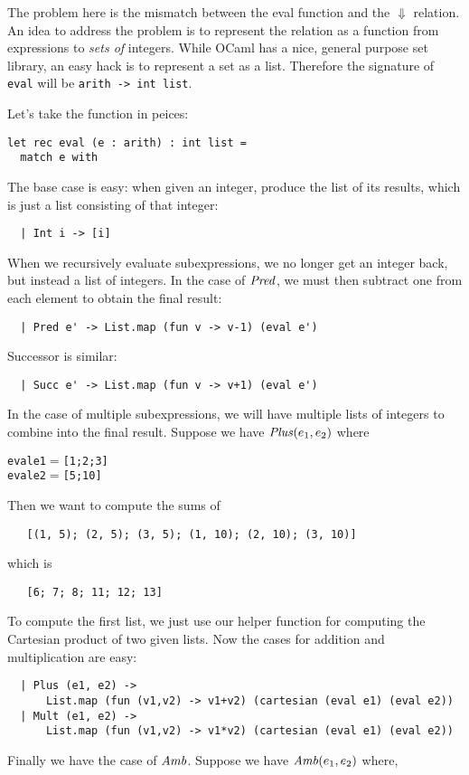 The problem here is the mismatch between the eval function and the
$\Downarrow$ relation.  An idea to address the problem is to represent
the relation as a function from expressions to \emph{sets of}
integers.  While OCaml has a nice, general purpose set library, an
easy hack is to represent a set as a list.  Therefore the signature of
{\tt eval} will be {\tt arith -> int list}.

Let's take the function in peices:
\begin{verbatim}
let rec eval (e : arith) : int list =
  match e with
\end{verbatim}
The base case is easy: when given an integer, produce the list of its
results, which is just a list consisting of that integer:
\begin{verbatim}
  | Int i -> [i]
\end{verbatim}
When we recursively evaluate subexpressions, we no longer get an
integer back, but instead a list of integers.  In the case of $\mathit{Pred}$,
we must then subtract one from each element to obtain the final result:
\begin{verbatim}
  | Pred e' -> List.map (fun v -> v-1) (eval e')
\end{verbatim}
Successor is similar:
\begin{verbatim}
  | Succ e' -> List.map (fun v -> v+1) (eval e')
\end{verbatim}
In the case of multiple subexpressions, we will have multiple lists of
integers to combine into the final result.  Suppose we have
$\mathit{Plus}(e_1,e_2)$ where
\begin{alltt}
   eval e1 \(=\) [1; 2; 3]
   eval e2 \(=\) [5; 10]
\end{alltt}
Then we want to compute the sums of
\begin{verbatim}
   [(1, 5); (2, 5); (3, 5); (1, 10); (2, 10); (3, 10)]
\end{verbatim}
which is
\begin{verbatim}
   [6; 7; 8; 11; 12; 13]
\end{verbatim}
To compute the first list, we just use our helper function for computing
the Cartesian product of two given lists.
%
Now the cases for addition and multiplication are easy:
\begin{verbatim}
  | Plus (e1, e2) -> 
      List.map (fun (v1,v2) -> v1+v2) (cartesian (eval e1) (eval e2))
  | Mult (e1, e2) -> 
      List.map (fun (v1,v2) -> v1*v2) (cartesian (eval e1) (eval e2))
\end{verbatim}
Finally we have the case of $\mathit{Amb}$.  Suppose we have $\mathit{Amb}(e_1,e_2)$ where,
